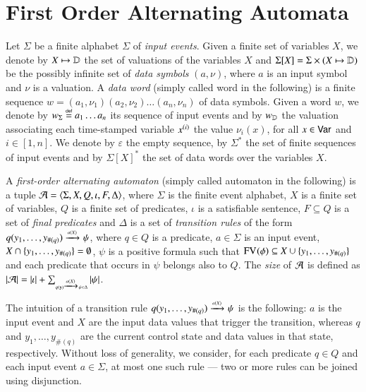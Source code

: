 \documentclass{llncs}
\begin{document}
\section{First Order Alternating Automata}

Let $\Sigma$ be a finite alphabet $\Sigma$ of \emph{input
  events}. Given a finite set of variables $X$, we denote by $X
\mapsto \mathbb{D}$ the set of valuations of the variables $X$ and
$\Sigma[X] = \Sigma \times (X \mapsto \mathbb{D})$ be the possibly infinite
set of \emph{data symbols} $(a,\nu)$, where $a$ is an input symbol and
$\nu$ is a valuation. A \emph{data word} (simply called word in the
following) is a finite sequence $w=(a_1,\nu_1)(a_2,\nu_2) \ldots
(a_n,\nu_n)$ of data symbols. Given a word $w$, we denote by
${w}_\Sigma \stackrel{\scriptscriptstyle{\mathsf{def}}}{=} a_1\ldots a_n$ its sequence of input events and by
${w}_{\mathbb{D}}$ the valuation associating each time-stamped variable
${x}^{({i})}$ the value $\nu_i(x)$, for all $x \in \mathsf{Var}$ and
$i\in[1,n]$. We denote by $\varepsilon$ the empty sequence, by
$\Sigma^*$ the set of finite sequences of input events and by
$\Sigma[X]^*$ the set of data words over the variables $X$.

A \emph{first-order alternating automaton} (simply called automaton in
the following) is a tuple $\mathcal{A} = \langle \Sigma,X,Q,\iota,F,\Delta \rangle$,
where $\Sigma$ is the finite event alphabet, $X$ is a finite set of
variables, $Q$ is a finite set of predicates, $\iota$ is a satisfiable
sentence, $F \subseteq Q$ is a set of \emph{final predicates} and
$\Delta$ is a set of \emph{transition rules} of the form
\(q(y_1,\ldots,y_{\#(q)}) \xrightarrow{{\scriptscriptstyle a(X)}}_{{\scriptstyle }} \psi\), where $q \in Q$ is a
predicate, $a \in \Sigma$ is an input event, $X \cap
\{ y_1,\ldots,y_{\#(q)} \} = \emptyset$, $\psi$ is a positive formula
such that $\mathrm{FV}_{}(\phi) \subseteq X \cup \{ y_1,\ldots,y_{\#(q)} \}$
and each predicate that occurs in $\psi$ belongs also to $Q$. The
\emph{size} of $\mathcal{A}$ is defined as ${|{\mathcal{A}}|} = {|{\iota}|} +
\sum_{\scriptscriptstyle{q(\mathbf y) \xrightarrow{{\scriptscriptstyle a(X)}}_{{\scriptstyle }} \psi \in \Delta}} {|{\psi}|}$.

The intuition of a transition rule \(q(y_1,\ldots,y_{\#(q)})
\xrightarrow{{\scriptscriptstyle a(X)}}_{{\scriptstyle }} \psi\) is the following: $a$ is the input event and $X$
are the input data values that trigger the transition, whereas $q$ and
$y_1,\ldots,y_{\#(q)}$ are the current control state and data values
in that state, respectively. Without loss of generality, we consider,
for each predicate $q \in Q$ and each input event $a \in \Sigma$, at
most one such rule --- two or more rules can be joined using
disjunction.
\end{document}
